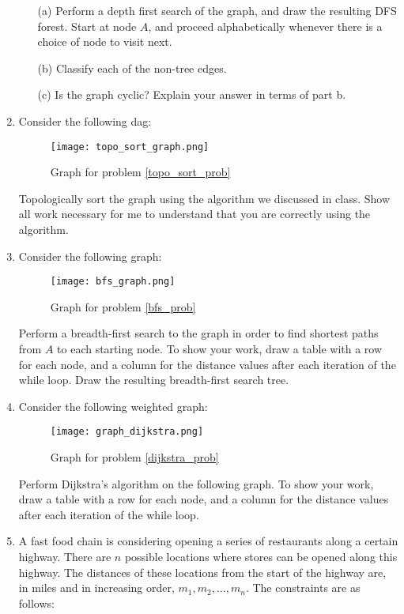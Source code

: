 \documentclass[12pt]{article}
\begin{document}
\begin{enumerate}
    \begin{itemize}
        \item[(a)] Perform a depth first search of the graph, and draw the resulting DFS forest. Start at node $A$, and proceed alphabetically whenever there is a choice of node to visit next. 
        \item[(b)] Classify each of the non-tree edges.  
        \item[(c)] Is the graph cyclic? Explain your answer in terms of part b. 
    \end{itemize}
    \label{dfs_prob}
    \newpage
    \item Consider the following dag:
    \begin{figure}[h]
        \centering
        \caption{Graph for problem \ref{topo_sort_prob}}
        \texttt{[image: topo\_sort\_graph.png]}
    \end{figure}
    Topologically sort the graph using the algorithm we discussed in class. Show all work necessary for me to understand that you are correctly using the algorithm. 
    \label{topo_sort_prob}
    \newpage
    \item Consider the following graph: \label{bfs}
    \begin{figure}[h]
        \centering
        \caption{Graph for problem \ref{bfs_prob}}
        \texttt{[image: bfs\_graph.png]}
    \end{figure}
     Perform a breadth-first search to the graph in order to find shortest paths from $A$ to each starting node. To show your work, draw a table with a row for each node, and a column for the distance values after each iteration of the while loop. Draw the resulting breadth-first search tree.
    \newpage
    \item Consider the following weighted graph:
    \begin{figure}[h]
        \centering
        \caption{Graph for problem \ref{dijkstra_prob}}
        \texttt{[image: graph\_dijkstra.png]}
    \end{figure}
    Perform Dijkstra's algorithm on the following graph. To show your work, draw a table with a row for each node, and a column for the distance values after each iteration of the while loop. \label{dijkstra_prob}
    \newpage
    \item A fast food chain is considering opening a series of restaurants along a certain highway. There are $n$ possible locations where stores can be opened along this highway. The distances of these locations from the start of the highway are, in miles and in increasing order, $m_1, m_2, \ldots, m_n$. The constraints are as follows:

\end{enumerate}
\end{document}
